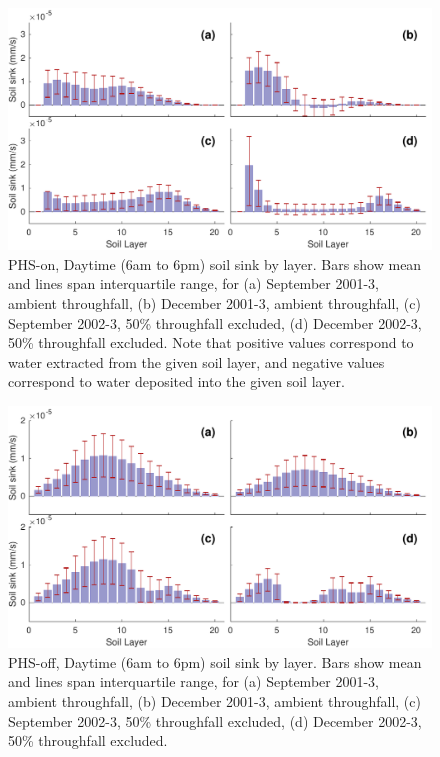 \documentclass[draft,linenumbers]{agujournal}
\begin{document}
      \clearpage
    \begin{figure}[h]
     \centering
     \includegraphics[width=30pc]{../figs/fig7.pdf}
     \caption{PHS-on, Daytime (6am to 6pm) soil sink by layer. 
     Bars show mean and lines span interquartile range, for 
     (a) September 2001-3, ambient throughfall,
     (b) December 2001-3, ambient throughfall,
     (c) September 2002-3, 50\% throughfall excluded,
     (d) December 2002-3, 50\% throughfall excluded. 
     Note that positive values correspond to water extracted from the given soil layer, 
     and negative values correspond to water deposited into the given soil layer.}
     \label{fig2}
  \end{figure}
  
        \clearpage
    \begin{figure}[h]
     \centering
     \includegraphics[width=30pc]{../figs/fig8.pdf}
     \caption{PHS-off, Daytime (6am to 6pm) soil sink by layer. 
          Bars show mean and lines span interquartile range, for  
     (a) September 2001-3, ambient throughfall,
     (b) December 2001-3, ambient throughfall,
     (c) September 2002-3, 50\% throughfall excluded,
     (d) December 2002-3, 50\% throughfall excluded. }
     \label{fig2}
  \end{figure}
  
\end{document}
